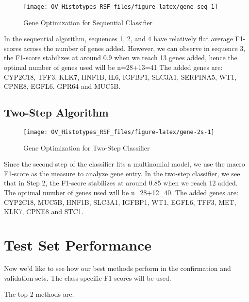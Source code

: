 \documentclass[
]{report}
\begin{document}
\begin{figure}[H]

{\centering \texttt{[image: OV\_Histotypes\_RSF\_files/figure-latex/gene-seq-1]} 

}

\caption{Gene Optimization for Sequential Classifier}\label{fig:gene-seq}
\end{figure}

In the sequential algorithm, sequences 1, 2, and 4 have relatively flat average F1-scores across the number of genes added. However, we can observe in sequence 3, the F1-score stabilizes at around 0.9 when we reach 13 genes added, hence the optimal number of genes used will be n=28+13=41 The added genes are: CYP2C18, TFF3, KLK7, HNF1B, IL6, IGFBP1, SLC3A1, SERPINA5, WT1, CPNE8, EGFL6, GPR64 and MUC5B.

\subsection{Two-Step Algorithm}\label{two-step-algorithm-1}

\begin{figure}[H]

{\centering \texttt{[image: OV\_Histotypes\_RSF\_files/figure-latex/gene-2s-1]} 

}

\caption{Gene Optimization for Two-Step Classifier}\label{fig:gene-2s}
\end{figure}

Since the second step of the classifier fits a multinomial model, we use the macro F1-score as the measure to analyze gene entry. In the two-step classifier, we see that in Step 2, the F1-score stabilizes at around 0.85 when we reach 12 added. The optimal number of genes used will be n=28+12=40. The added genes are: CYP2C18, MUC5B, HNF1B, SLC3A1, IGFBP1, WT1, EGFL6, TFF3, MET, KLK7, CPNE8 and STC1.

\section{Test Set Performance}\label{test-set-performance}

Now we'd like to see how our best methods perform in the confirmation and validation sets. The class-specific F1-scores will be used.

The top 2 methods are:
\end{document}
